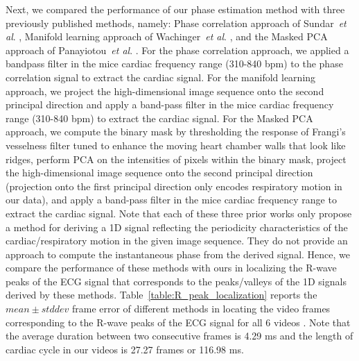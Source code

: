 \documentclass[journal]{IEEEtran}
\newcommand{\etal}{~\textit{et al}. }
\newcommand{\rk}[1]{{\color{blue}{#1}}}
\begin{document}
Next, we compared the performance of our phase estimation method with three previously published methods, namely: Phase correlation approach of Sundar\etal\cite{Sundar2009}, Manifold learning approach of Wachinger\etal\cite{Wachinger2012}, and the Masked PCA approach of Panayiotou\etal\cite{Panayiotou2014}. For the phase correlation approach, we applied a bandpass filter in the mice cardiac frequency range (310-840 bpm) to the phase correlation signal to extract the cardiac signal. For the manifold learning approach, we project the high-dimensional image sequence onto the second principal direction and apply a band-pass filter in the mice cardiac frequency range (310-840 bpm) to extract the cardiac signal. For the Masked PCA approach, we compute the binary mask by thresholding the response of Frangi's vesselness filter tuned to enhance the moving heart chamber walls that look like ridges, perform PCA on the intensities of pixels within the binary mask,  project the high-dimensional image sequence onto the second principal direction (projection onto the first principal direction only encodes respiratory motion in our data), and apply a band-pass filter in the mice cardiac frequency range to extract the cardiac signal. Note that each of these three prior works only propose a method for deriving a 1D signal reflecting the periodicity characteristics of the cardiac/respiratory motion in the given image sequence. They do not provide an approach to compute the instantaneous phase from the derived signal. Hence, we compare the performance of these methods with ours in localizing the R-wave peaks of the ECG signal that corresponds to the peaks/valleys of the 1D signals derived by these methods. Table~\ref{table:R_peak_localization} reports the $mean \pm stddev$ frame error of different methods in locating the video frames corresponding to the R-wave peaks of the ECG signal for all 6 videos \rk{where in the result of the best performing method for each video is highlighted in bold}. Note that the average duration between two consecutive frames is 4.29 ms and the length of cardiac cycle in our videos is 27.27 frames or 116.98 ms.
	
\end{document}
